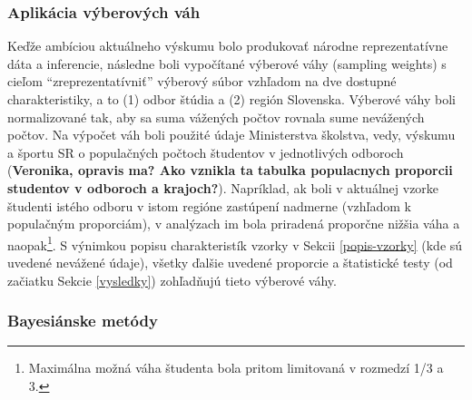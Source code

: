 \documentclass[
]{article}
\begin{document}
\hypertarget{aplikuxe1cia-vuxfdberovuxfdch-vuxe1h}{%
\subsubsection{Aplikácia výberových váh}\label{aplikuxe1cia-vuxfdberovuxfdch-vuxe1h}}

Keďže ambíciou aktuálneho výskumu bolo produkovať národne reprezentatívne dáta a inferencie, následne boli vypočítané výberové váhy (sampling weights) s cieľom ``zreprezentatívniť'' výberový súbor vzhľadom na dve dostupné charakteristiky, a to (1) odbor štúdia a (2) región Slovenska. Výberové váhy boli normalizované tak, aby sa suma vážených počtov rovnala sume nevážených počtov. Na výpočet váh boli použité údaje Ministerstva školstva, vedy, výskumu a športu SR o populačných počtoch študentov v jednotlivých odboroch (\textbf{Veronika, opravis ma? Ako vznikla ta tabulka populacnych proporcii studentov v odboroch a krajoch?}). Napríklad, ak boli v aktuálnej vzorke študenti istého odboru v istom regióne zastúpení nadmerne (vzhľadom k populačným proporciám), v analýzach im bola priradená proporčne nižšia váha a naopak\footnote{Maximálna možná váha študenta bola pritom limitovaná v rozmedzí 1/3 a 3.}. S výnimkou popisu charakteristík vzorky v Sekcii \ref{popis-vzorky} (kde sú uvedené nevážené údaje), všetky ďalšie uvedené proporcie a štatistické testy (od začiatku Sekcie \ref{vysledky}) zohľadňujú tieto výberové váhy.

\hypertarget{bayesiuxe1nske-metuxf3dy}{%
\subsubsection{Bayesiánske metódy}\label{bayesiuxe1nske-metuxf3dy}}
\end{document}
